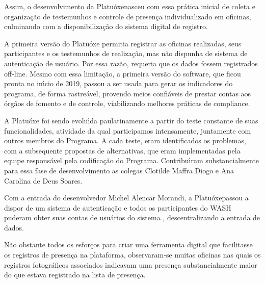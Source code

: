 \documentclass[
12pt,		%
openright,	%
twoside,  %
a4paper,			%
chapter=TITLE,		%
english,			%
french,				%
spanish,			%
brazil				%
]{USPSC-classe/USPSC}
\begin{document}
Assim, o desenvolvimento da \textquotedbl Platu\'oxe\textquotedbl  nasceu com essa pr\'atica inicial de coleta e organiza\c{c}\~ao de testemunhos e controle de presen\c{c}a individualizado em oficinas, culminando com a disponibiliza\c{c}\~ao do sistema digital de registro.









A primeira vers\~ao do Platu\'oxe permitia registrar as oficinas realizadas, seus participantes e os testemunhos de realiza\c{c}\~ao, mas n\~ao dispunha de sistema de autentica\c{c}\~ao de usu\'ario. Por essa raz\~ao, requeria que os dados fossem registrados off-line. Mesmo com essa limita\c{c}\~ao, a primeira vers\~ao do software, que ficou pronta no in\'{\i}cio de 2019, passou a ser usada para gerar os indicadores do programa, de forma rastre\'avel, provendo meios confi\'aveis de prestar contas aos \'org\~aos de fomento e de controle, viabilizando melhores pr\'aticas de \textquotedbl compliance\textquotedbl .









A Platu\'oxe foi sendo evolu\'{\i}da paulatinamente a partir do teste constante de suas funcionalidades, atividade da qual participamos intensamente, juntamente com outros membros do Programa. A cada teste, eram identificados os problemas, com a subsequente propostas de alternativas, que eram implementadas pela equipe respons\'avel pela codifica\c{c}\~ao do Programa. Contribu\'{\i}ram substancialmente para essa fase de desenvolvimento as colegas Clotilde Maffra Diogo e Ana Carolina de Deus Soares.









Com a entrada do desenvolvedor Michel Alencar Morandi, a \textquotedbl Platu\'oxe\textquotedbl  passou a dispor de um sistema de autentica\c{c}\~ao e todos os participantes do WASH puderam obter suas \textquotedbl contas de usu\'arios do sistema \textquotedbl , descentralizando a entrada de dados.









N\~ao obstante todos os esfor\c{c}os para criar uma ferramenta digital que facilitasse os registros de presen\c{c}a na plataforma, observaram-se muitas oficinas nas quais os registros fotogr\'aficos associados indicavam uma presen\c{c}a substancialmente maior do que estava registrado na lista de presen\c{c}a.
\end{document}
